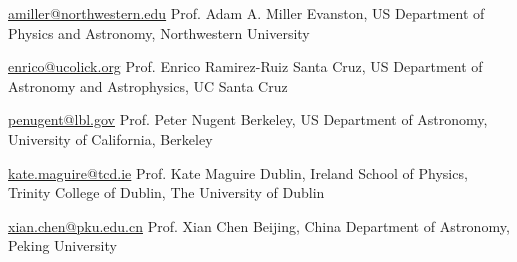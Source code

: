 


\begin{cvreferences}
	
\cvreference
	{\href{mailto:amiller@northwestern.edu}{\faEnvelope\acvHeaderIconSep amiller@northwestern.edu}} %
	{Prof. Adam A. Miller} %
	{Evanston, US} %
	{Department of Physics and Astronomy, Northwestern University} %


	
\cvreference
	{\href{mailto:enrico@ucolick.org}{\faEnvelope\acvHeaderIconSep enrico@ucolick.org}} %
	{Prof. Enrico Ramirez-Ruiz} %
	{Santa Cruz, US} %
	{Department of Astronomy and Astrophysics, UC Santa Cruz} %


\cvreference
	{\href{penugent@lbl.gov}{\faEnvelope\acvHeaderIconSep penugent@lbl.gov}} %
	{Prof. Peter Nugent} %
	{Berkeley, US} %
	{Department of Astronomy, University of California, Berkeley} %
	

\cvreference
	{\href{mailto:kate.maguire@tcd.ie}{\faEnvelope\acvHeaderIconSep kate.maguire@tcd.ie}} %
	{Prof. Kate Maguire} %
	{Dublin, Ireland} %
	{School of Physics, Trinity College of Dublin, The University of Dublin} %
	

\cvreference
	{\href{mailto:xian.chen@pku.edu.cn}{\faEnvelope\acvHeaderIconSep xian.chen@pku.edu.cn}} %
	{Prof. Xian Chen} %
	{Beijing, China} %
	{Department of Astronomy, Peking University} %
	
	
	




\end{cvreferences}